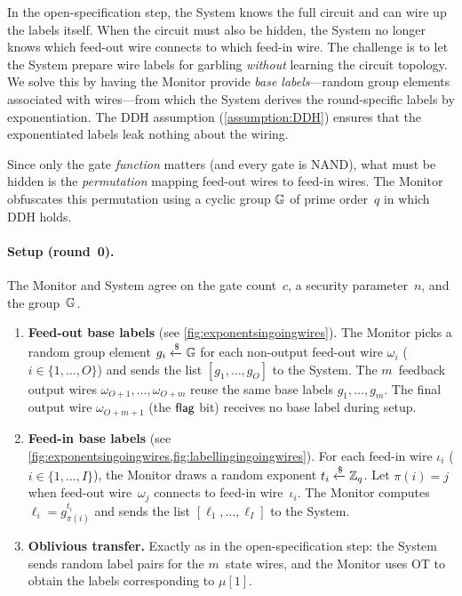 In the open-specification step, the System knows the full circuit and can wire up the labels itself. When the circuit must also be hidden, the System no longer knows which feed-out wire connects to which feed-in wire. The challenge is to let the System prepare wire labels for garbling \emph{without} learning the circuit topology. We solve this by having the Monitor provide \emph{base labels}---random group elements associated with wires---from which the System derives the round-specific labels by exponentiation. The DDH assumption (\cref{assumption:DDH}) ensures that the exponentiated labels leak nothing about the wiring.

Since only the gate \emph{function} matters (and every gate is NAND), what must be hidden is the \emph{permutation} mapping feed-out wires to feed-in wires. The Monitor obfuscates this permutation using a cyclic group $\mathbb{G}$ of prime order~$q$ in which DDH holds.

\paragraph{Setup (round~0).}\label{protocol2}
The Monitor and System agree on the gate count~$c$, a security parameter~$n$, and the group~$\mathbb{G}$.

\begin{enumerate}
    \item \textbf{Feed-out base labels} (see \cref{fig:exponentsingoingwires}). The Monitor picks a random group element $g_i \xleftarrow{\$} \mathbb{G}$ for each non-output feed-out wire $\omega_i$ ($i \in \{1,\ldots,O\}$) and sends the list $[g_1,\ldots,g_O]$ to the System. The $m$~feedback output wires $\omega_{O+1},\ldots,\omega_{O+m}$ reuse the same base labels $g_1,\ldots,g_m$. The final output wire $\omega_{O+m+1}$ (the $\textsf{flag}$ bit) receives no base label during setup.
    \item \textbf{Feed-in base labels} (see \cref{fig:exponentsingoingwires,fig:labellingingoingwires}). For each feed-in wire $\iota_i$ ($i \in \{1,\ldots,I\}$), the Monitor draws a random exponent $t_i \xleftarrow{\$} \mathbb{Z}_q$. Let $\pi(i) = j$ when feed-out wire~$\omega_j$ connects to feed-in wire~$\iota_i$. The Monitor computes $\ell_i = g_{\pi(i)}^{t_i}$ and sends the list $[\ell_1,\ldots,\ell_I]$ to the System.
    \item \textbf{Oblivious transfer.} Exactly as in the open-specification step: the System sends random label pairs for the $m$~state wires, and the Monitor uses OT to obtain the labels corresponding to $\mu[1]$.
\end{enumerate}

